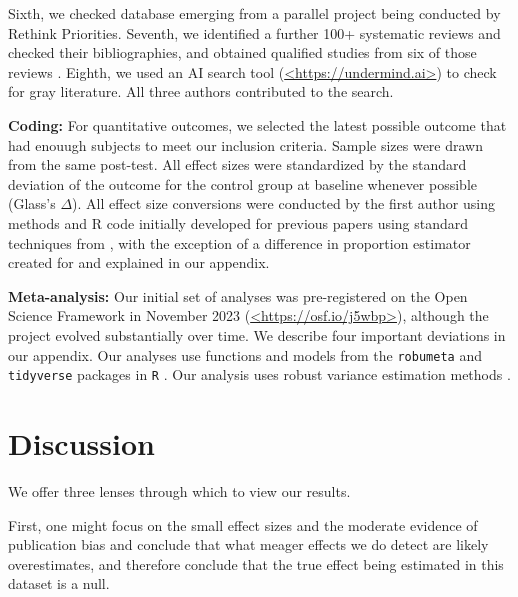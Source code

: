 \documentclass[sn-nature,pdflatex]{sn-jnl}
\begin{document}
\begin{comment} 
does this need more description? This is not entirely reproducible I think but TBH it was not a major source of studies in our database
\end{comment}

Sixth, we checked database emerging from a parallel project being
conducted by Rethink Priorities. Seventh, we identified a further 100+
systematic reviews and checked their bibliographies, and obtained
qualified studies from six of those reviews
\citep{ammann2023, chang2023, DiGennaro2024, harguess2020, ronto2022, wynes2018}.
Eighth, we used an AI search tool (\url{<https://undermind.ai>}) to
check for gray literature. All three authors contributed to the search.

\textbf{Coding:} For quantitative outcomes, we selected the latest
possible outcome that had enouugh subjects to meet our inclusion
criteria. Sample sizes were drawn from the same post-test. All effect
sizes were standardized by the standard deviation of the outcome for the
control group at baseline whenever possible (Glass's \(\Delta\)). All
effect size conversions were conducted by the first author using methods
and R code initially developed for previous papers
\citep{paluck2019, paluck2021, porat2024} using standard techniques from
\citep{cooper2019}, with the exception of a difference in proportion
estimator created for \citep{paluck2021} and explained in our appendix.

\textbf{Meta-analysis:} Our initial set of analyses was pre-registered
on the Open Science Framework in November 2023
(\url{<https://osf.io/j5wbp>}), although the project evolved
substantially over time. We describe four important deviations in our
appendix. Our analyses use functions and models from the
\texttt{robumeta} \citep{fisher2015} and \texttt{tidyverse}
\citep{wickham2019} packages in \texttt{R} \citep{Rlang}. Our analysis
uses robust variance estimation methods \citep{hedges2010}.

\section{Discussion}\label{Sec4}

We offer three lenses through which to view our results.

First, one might focus on the small effect sizes and the moderate
evidence of publication bias and conclude that what meager effects we do
detect are likely overestimates, and therefore conclude that the true
effect being estimated in this dataset is a null.
\end{document}
